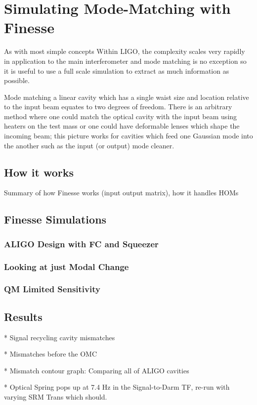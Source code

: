 \chapter{Simulating Mode-Matching with Finesse}
As with most simple concepts Within LIGO, the complexity scales very rapidly in application to the main interferometer and mode matching is no exception so it is useful to use a full scale simulation to extract as much information as possible.

Mode matching a linear cavity which has a single waist size and location relative to the input beam equates to two degrees of freedom.  There is an arbitrary method where one could match the optical cavity with the input beam using heaters on the test mass or one could have deformable lenses which shape the incoming beam; this picture works for cavities which feed one Gaussian mode into the another such as the input (or output) mode cleaner.  

 
	\section{How it works}

	\cite{FinesseManual}
	Summary of how Finesse works (input output matrix), how it handles HOMs
	\section{Finesse Simulations}
		\subsection{ALIGO Design with FC and Squeezer}
		\subsection{Looking at just Modal Change}
		\subsection{QM Limited Sensitivity}
			
	\section{Results}
		* Signal recycling cavity mismatches

		* Mismatches before the OMC
			
		* Mismatch contour graph: Comparing all of ALIGO cavities
		
		* Optical Spring pops up at 7.4 Hz in the Signal-to-Darm TF, re-run with varying SRM Trans which should.